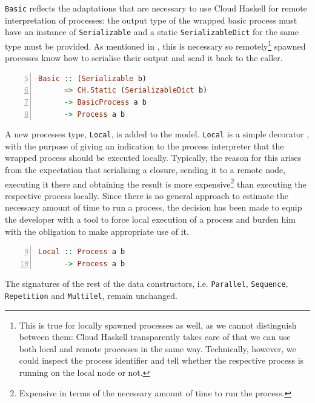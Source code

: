 \texttt{Basic} reflects the adaptations that are necessary to use \textsf{Cloud Haskell} for remote interpretation of processes: the output type of the wrapped basic process must have an instance of \texttt{Serializable} and a static \texttt{SerializableDict} for the same type must be provided. As mentioned in , this is necessary so remotely\footnote{This is true for locally spawned processes as well, as we cannot distinguish between them: \textsf{Cloud Haskell} transparently takes care of that we can use both local and remote processes in the same way. Technically, however, we could inspect the process identifier and tell whether the respective process is running on the local node or not.} spawned processes know how to serialise their output and send it back to the caller.
\begin{lstlisting}[language=Haskell,caption=Signature of the \texttt{Basic} data constructor.,numbers=left,frame=bt,firstnumber=5]
Basic :: (Serializable b)
      => CH.Static (SerializableDict b)
      -> BasicProcess a b
      -> Process a b
\end{lstlisting}

A new processes type, \texttt{Local}, is added to the model. \texttt{Local} is a simple decorator \cite{Gamma:1995:DPE:186897}, with the purpose of giving an indication to the process interpreter that the wrapped process should be executed locally. Typically, the reason for this arises from the expectation that serialising a closure, sending it to a remote node, executing it there and obtaining the result is more expensive\footnote{Expensive in terms of the necessary amount of time to run the process.} than executing the respective process locally. Since there is no general approach to estimate the necessary amount of time to run a process, the decision has been made to equip the developer with a tool to force local execution of a process and burden him with the obligation to make appropriate use of it.
\begin{lstlisting}[language=Haskell,caption=Signature of the additional \texttt{Local} data constructor.,numbers=left,frame=bt,firstnumber=9]
Local :: Process a b
      -> Process a b
\end{lstlisting}

The signatures of the rest of the data constructors, i.e. \texttt{Parallel}, \texttt{Sequence}, \texttt{Repetition} and \texttt{Multilel}, remain unchanged.

